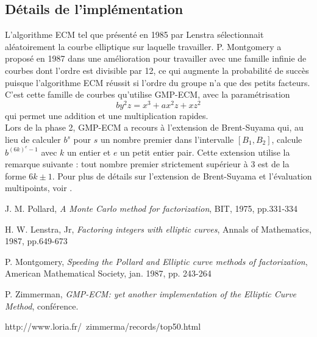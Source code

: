 \documentclass[11pt,a4paper]{article}
\begin{document}
\subsection{Détails de l'implémentation}
L'algorithme ECM tel que présenté en 1985 par Lenstra sélectionnait aléatoirement la courbe elliptique sur laquelle travailler. P. Montgomery a proposé en 1987 dans \cite{montgomery} une amélioration pour travailler avec une famille infinie de courbes dont l'ordre est divisible par 12, ce qui augmente la probabilité de succès puisque l'algorithme ECM réussit si l'ordre du groupe n'a que des petits facteurs. C'est cette famille de courbes qu'utilise GMP-ECM, avec la paramétrisation 
\[
by^2z = x^3 + ax^2z + xz^2
\]
qui permet une addition et une multiplication rapides. \\

Lors de la phase 2, GMP-ECM a recours à l'extension de Brent-Suyama qui, au lieu de calculer $b^s$ pour $s$ un nombre premier dans l'intervalle $[B_1, B_2]$, calcule $b^{(6k)^e - 1}$ avec $k$ un entier et $e$ un petit entier pair. Cette extension utilise la remarque suivante : tout nombre premier strictement supérieur à 3 est de la forme $6k \pm 1$. Pour plus de détails sur l'extension de Brent-Suyama et l'évaluation multipoints, voir \cite{zimmerman}.

\begin{thebibliography}{9}
J. M. Pollard, \emph{A Monte Carlo method for factorization}, BIT, 1975, pp.331-334

H. W. Lenstra, Jr, \emph{Factoring integers with elliptic curves}, Annals of Mathematics, 1987, pp.649-673

P. Montgomery, \emph{Speeding the Pollard and Elliptic curve methods of factorization}, American Mathematical Society, jan. 1987, pp. 243-264

P. Zimmerman, \emph{GMP-ECM: yet another implementation of the Elliptic Curve Method}, conférence.

http://www.loria.fr/~zimmerma/records/top50.html


\end{thebibliography}
\end{document}
